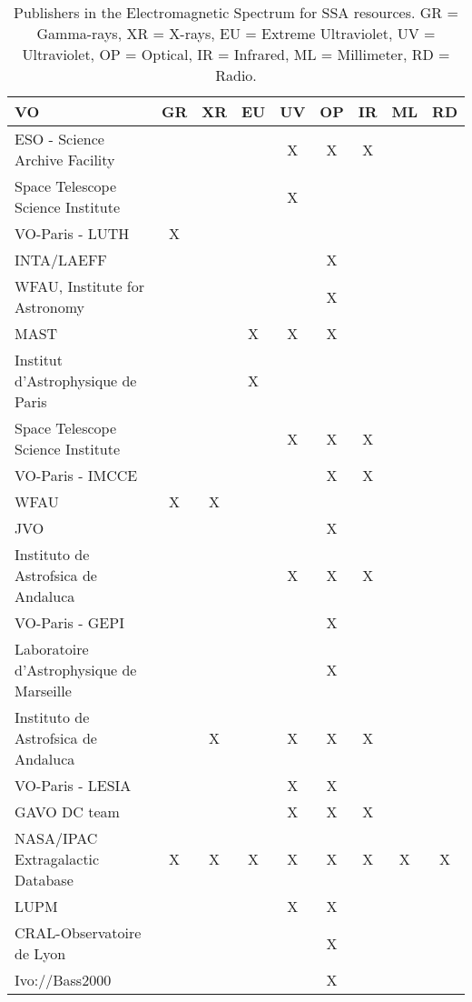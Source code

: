 \begin{table}
\begin{center}
\begin{tabular}{|l|c|c|c|c|c|c|c|c|}
\hline
\textbf{VO} & GR & XR & EU & UV & OP & IR & ML & RD \\
\hline
\hline
  ESO - Science Archive Facility  & & & & X & X & X & & \\
\hline
  Space Telescope Science Institute & & & & X & & & & \\
\hline
  VO-Paris - LUTH & X & & & & & & & \\
\hline
  INTA/LAEFF & & & & & X & & & \\
\hline
  WFAU, Institute for Astronomy & & & & & X & & & \\
\hline
  MAST & & & X & X & X & & & \\
\hline
  Institut d'Astrophysique de Paris & & & X & & & & & \\
\hline
  Space Telescope Science Institute & & & & X & X & X & & \\
\hline
  VO-Paris - IMCCE & & & & & X & X & & \\
\hline
  WFAU & X & X & & & & & & \\
\hline
  JVO & & & & & X & & & \\
\hline
  Instituto de Astrofsica de Andaluca & & & & X & X & X & & \\
\hline
  VO-Paris - GEPI  & & & & & X & & & \\
\hline
  Laboratoire d'Astrophysique de Marseille & & & & & X & & & \\
\hline
  Instituto de Astrofsica de Andaluca & & X & & X & X & X & & \\
\hline
  VO-Paris - LESIA & & & & X & X & & & \\
\hline
  GAVO DC team  & & & & X & X & X & & \\
\hline
  NASA/IPAC Extragalactic Database & X & X & X & X & X & X & X & X \\
\hline
  LUPM & & & & X & X & & & \\
\hline
  CRAL-Observatoire de Lyon & & & & & X & & & \\
\hline
  Ivo://Bass2000 & & & & & X & & & \\
\hline
\end{tabular}
\caption{Publishers in the Electromagnetic Spectrum for SSA resources.
GR = Gamma-rays, XR = X-rays, EU = Extreme Ultraviolet, UV = Ultraviolet, OP
= Optical, IR = Infrared, ML = Millimeter, RD = Radio.}
\label{tab:SSAEMS}
\end{center}
\end{table}

